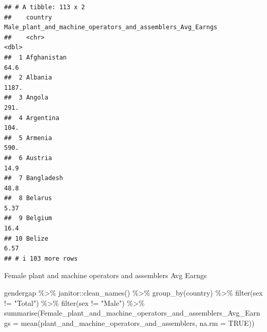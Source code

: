 \documentclass[
]{article}
\newenvironment{Shaded}{\begin{snugshade}}{\end{snugshade}}
\newcommand{\AttributeTok}[1]{\textcolor[rgb]{0.77,0.63,0.00}{#1}}
\newcommand{\ConstantTok}[1]{\textcolor[rgb]{0.00,0.00,0.00}{#1}}
\newcommand{\FunctionTok}[1]{\textcolor[rgb]{0.00,0.00,0.00}{#1}}
\newcommand{\NormalTok}[1]{#1}
\newcommand{\SpecialCharTok}[1]{\textcolor[rgb]{0.00,0.00,0.00}{#1}}
\newcommand{\StringTok}[1]{\textcolor[rgb]{0.31,0.60,0.02}{#1}}
\begin{document}
\begin{verbatim}
## # A tibble: 113 x 2
##    country     Male_plant_and_machine_operators_and_assemblers_Avg_Earngs
##    <chr>                                                            <dbl>
##  1 Afghanistan                                                      64.6 
##  2 Albania                                                        1187.  
##  3 Angola                                                          291.  
##  4 Argentina                                                       104.  
##  5 Armenia                                                         590.  
##  6 Austria                                                          14.9 
##  7 Bangladesh                                                       48.8 
##  8 Belarus                                                           5.37
##  9 Belgium                                                          16.4 
## 10 Belize                                                            6.57
## # i 103 more rows
\end{verbatim}

Female plant and machine operators and assemblers Avg Earngs

\begin{Shaded}
\begin{Highlighting}[]
\NormalTok{gendergap }\SpecialCharTok{\%\textgreater{}\%}
\NormalTok{  janitor}\SpecialCharTok{::}\FunctionTok{clean\_names}\NormalTok{() }\SpecialCharTok{\%\textgreater{}\%}
  \FunctionTok{group\_by}\NormalTok{(country) }\SpecialCharTok{\%\textgreater{}\%} 
   \FunctionTok{filter}\NormalTok{(sex }\SpecialCharTok{!=} \StringTok{"Total"}\NormalTok{) }\SpecialCharTok{\%\textgreater{}\%}
  \FunctionTok{filter}\NormalTok{(sex }\SpecialCharTok{!=} \StringTok{"Male"}\NormalTok{) }\SpecialCharTok{\%\textgreater{}\%}
  \FunctionTok{summarise}\NormalTok{(}\AttributeTok{Female\_plant\_and\_machine\_operators\_and\_assemblers\_Avg\_Earngs =} \FunctionTok{mean}\NormalTok{(plant\_and\_machine\_operators\_and\_assemblers, }\AttributeTok{na.rm =} \ConstantTok{TRUE}\NormalTok{))}
\end{Highlighting}
\end{Shaded}
\end{document}
